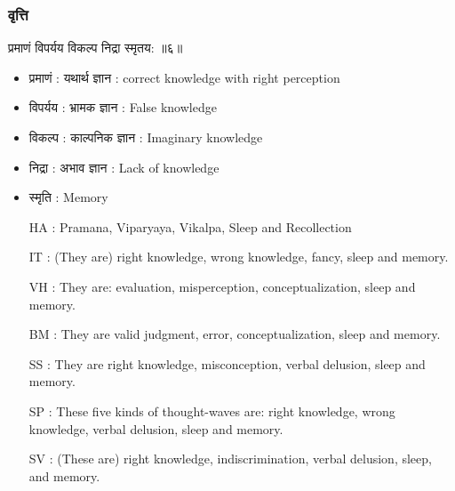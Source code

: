 \begin{frame}[fragile]\frametitle{वृत्ति}

\begin{sanskrit}
 प्रमाणं विपर्यय विकल्प निद्रा स्मृतय: ॥६॥
\end{sanskrit}


\begin{itemize}
\item प्रमाणं : यथार्थ ज्ञान : correct knowledge with right perception
\item विपर्यय : भ्रामक ज्ञान : False knowledge
\item विकल्प : काल्पनिक ज्ञान : Imaginary knowledge
\item निद्रा : अभाव ज्ञान : Lack of knowledge
\item स्मृति : Memory
\item [HA]: Pramana, Viparyaya, Vikalpa, Sleep and Recollection
\item [IT]: (They are) right knowledge, wrong knowledge, fancy, sleep and memory.
\item [VH]: They are: evaluation, misperception, conceptualization, sleep and memory.
\item [BM]: They are valid judgment, error, conceptualization, sleep and memory.
\item [SS]: They are right knowledge, misconception, verbal delusion, sleep and memory.
\item [SP]: These five kinds of thought-waves are: right knowledge, wrong knowledge, verbal delusion, sleep and memory.
\item [SV]: (These are) right knowledge, indiscrimination, verbal delusion, sleep, and memory.
\end{itemize}	

\end{frame}



